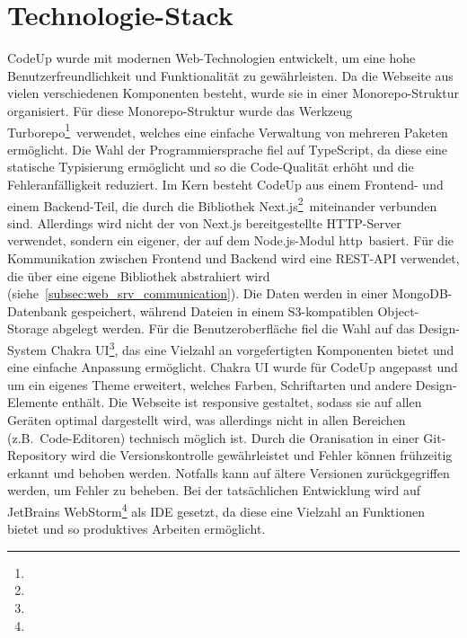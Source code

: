 \documentclass[main.tex]{subfiles}
\begin{document}
    \section{Technologie-Stack}
    CodeUp wurde mit modernen Web-Technologien entwickelt, um eine hohe Benutzerfreundlichkeit und Funktionalität zu gewährleisten.
    Da die Webseite aus vielen verschiedenen Komponenten besteht, wurde sie in einer Monorepo-Struktur organisiert.
    Für diese Monorepo-Struktur wurde das Werkzeug \dq Turborepo\dq\footnote{}\ verwendet, welches eine einfache Verwaltung von mehreren Paketen ermöglicht.
    Die Wahl der Programmiersprache fiel auf TypeScript, da diese eine statische Typisierung ermöglicht und so die Code-Qualität erhöht und die Fehleranfälligkeit reduziert.
    Im Kern besteht CodeUp aus einem Frontend- und einem Backend-Teil, die durch die Bibliothek \dq Next.js\dq\footnote{}\ miteinander verbunden sind.
    Allerdings wird nicht der von Next.js bereitgestellte HTTP-Server verwendet, sondern ein eigener, der auf dem Node.js-Modul \dq http\dq\ basiert.
    Für die Kommunikation zwischen Frontend und Backend wird eine REST-API verwendet, die über eine eigene Bibliothek abstrahiert wird (siehe~\ref{subsec:web_srv_communication}).
    Die Daten werden in einer MongoDB-Datenbank gespeichert, während Dateien in einem S3-kompatiblen Object-Storage abgelegt werden.
    Für die Benutzeroberfläche fiel die Wahl auf das Design-System \dq Chakra UI\dq\footnote{}, das eine Vielzahl an vorgefertigten Komponenten bietet und eine einfache Anpassung ermöglicht.
    Chakra UI wurde für CodeUp angepasst und um ein eigenes Theme erweitert, welches Farben, Schriftarten und andere Design-Elemente enthält.
    Die Webseite ist responsive gestaltet, sodass sie auf allen Geräten optimal dargestellt wird, was allerdings nicht in allen Bereichen (z.B.~Code-Editoren) technisch möglich ist.
    Durch die Oranisation in einer Git-Repository wird die Versionskontrolle gewährleistet und Fehler können frühzeitig erkannt und behoben werden.
    Notfalls kann auf ältere Versionen zurückgegriffen werden, um Fehler zu beheben.
    Bei der tatsächlichen Entwicklung wird auf JetBrains WebStorm\footnote{} als IDE gesetzt, da diese eine Vielzahl an Funktionen bietet und so produktives Arbeiten ermöglicht.
\end{document}
